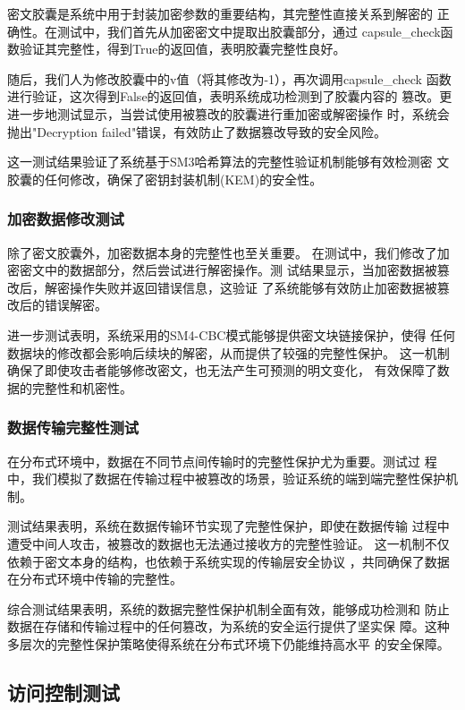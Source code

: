 密文胶囊是系统中用于封装加密参数的重要结构，其完整性直接关系到解密的
正确性。在测试中，我们首先从加密密文中提取出胶囊部分，通过
capsule\_check函数验证其完整性，得到True的返回值，表明胶囊完整性良好。

随后，我们人为修改胶囊中的v值（将其修改为-1），再次调用capsule\_check
函数进行验证，这次得到False的返回值，表明系统成功检测到了胶囊内容的
篡改。更进一步地测试显示，当尝试使用被篡改的胶囊进行重加密或解密操作
时，系统会抛出"Decryption failed"错误，有效防止了数据篡改导致的安全风险。

这一测试结果验证了系统基于SM3哈希算法的完整性验证机制能够有效检测密
文胶囊的任何修改，确保了密钥封装机制(KEM)的安全性。

\subsubsection{加密数据修改测试}

除了密文胶囊外，加密数据本身的完整性也至关重要。
在测试中，我们修改了加密密文中的数据部分，然后尝试进行解密操作。测
试结果显示，当加密数据被篡改后，解密操作失败并返回错误信息，这验证
了系统能够有效防止加密数据被篡改后的错误解密。

进一步测试表明，系统采用的SM4-CBC模式能够提供密文块链接保护，使得
任何数据块的修改都会影响后续块的解密，从而提供了较强的完整性保护。
这一机制确保了即使攻击者能够修改密文，也无法产生可预测的明文变化，
有效保障了数据的完整性和机密性。

\subsubsection{数据传输完整性测试}

在分布式环境中，数据在不同节点间传输时的完整性保护尤为重要。测试过
程中，我们模拟了数据在传输过程中被篡改的场景，验证系统的端到端完整性保护机制。

测试结果表明，系统在数据传输环节实现了完整性保护，即使在数据传输
过程中遭受中间人攻击，被篡改的数据也无法通过接收方的完整性验证。
这一机制不仅依赖于密文本身的结构，也依赖于系统实现的传输层安全协议
，共同确保了数据在分布式环境中传输的完整性。

综合测试结果表明，系统的数据完整性保护机制全面有效，能够成功检测和
防止数据在存储和传输过程中的任何篡改，为系统的安全运行提供了坚实保
障。这种多层次的完整性保护策略使得系统在分布式环境下仍能维持高水平
的安全保障。

\subsection{访问控制测试}

